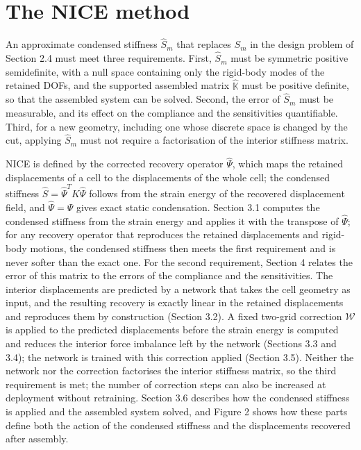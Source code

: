 \documentclass[preprint,12pt,authoryear]{elsarticle}
\begin{document}
\section{The NICE method}

An approximate condensed stiffness \(\widehat S_m\) that replaces \(S_m\) in the design problem of Section 2.4 must meet three requirements. First, \(\widehat S_m\) must be symmetric positive semidefinite, with a null space containing only the rigid-body modes of the retained DOFs, and the supported assembled matrix \(\widehat{\mathbb K}\) must be positive definite, so that the assembled system can be solved. Second, the error of \(\widehat S_m\) must be measurable, and its effect on the compliance and the sensitivities quantifiable. Third, for a new geometry, including one whose discrete space is changed by the cut, applying \(\widehat S_m\) must not require a factorisation of the interior stiffness matrix.

NICE is defined by the corrected recovery operator \(\widehat\Psi\), which maps the retained displacements of a cell to the displacements of the whole cell; the condensed stiffness \(\widehat S=\widehat\Psi^TK\widehat\Psi\) follows from the strain energy of the recovered displacement field, and \(\widehat\Psi=\Psi\) gives exact static condensation. Section 3.1 computes the condensed stiffness from the strain energy and applies it with the transpose of \(\widehat\Psi\); for any recovery operator that reproduces the retained displacements and rigid-body motions, the condensed stiffness then meets the first requirement and is never softer than the exact one. For the second requirement, Section 4 relates the error of this matrix to the errors of the compliance and the sensitivities. The interior displacements are predicted by a network that takes the cell geometry as input, and the resulting recovery is exactly linear in the retained displacements and reproduces them by construction (Section 3.2). A fixed two-grid correction \(\mathcal W\) is applied to the predicted displacements before the strain energy is computed and reduces the interior force imbalance left by the network (Sections 3.3 and 3.4); the network is trained with this correction applied (Section 3.5). Neither the network nor the correction factorises the interior stiffness matrix, so the third requirement is met; the number of correction steps can also be increased at deployment without retraining. Section 3.6 describes how the condensed stiffness is applied and the assembled system solved, and Figure 2 shows how these parts define both the action of the condensed stiffness and the displacements recovered after assembly.
\end{document}
